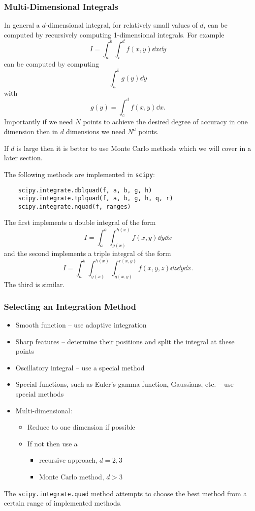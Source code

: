 \documentclass[a4paper]{article}
\begin{document}
    \subsubsection{Multi-Dimensional Integrals}
    In general a \(d\)-dimensional integral, for relatively small values of \(d\), can be computed by recursively computing 1-dimensional integrals.
    For example
    \[I = \int_a^b \int_c^d f(x, y)\dd{x}\dd{y}\]
    can be computed by computing
    \[\int_a^b g(y)\dd{y}\]
    with
    \[g(y) = \int_c^d f(x, y)\dd{x}.\]
    Importantly if we need \(N\) points to achieve the desired degree of accuracy in one dimension then in \(d\) dimensions we need \(N^d\) points.
    
    If \(d\) is large then it is better to use Monte Carlo methods which we will cover in a later section.
    
    The following methods are implemented in \lstinline|scipy|:
    \begin{lstlisting}
    scipy.integrate.dblquad(f, a, b, g, h)
    scipy.integrate.tplquad(f, a, b, g, h, q, r)
    scipy.integrate.nquad(f, ranges)
    \end{lstlisting}
    The first implements a double integral of the form
    \[I = \int_a^b \int_{g(x)}^{h(x)}f(x, y)\dd{y}\dd{x}\]
    and the second implements a triple integral of the form
    \[I = \int_a^b \int_{g(x)}^{h(x)}\int_{q(x, y)}^{r(x, y)} f(x, y, z) \dd{z}\dd{y}\dd{x}.\]
    The third is similar.
    
    \subsubsection{Selecting an Integration Method}
    \begin{itemize}
        \item Smooth function -- use adaptive integration
        \item Sharp features -- determine their positions and split the integral at these points
        \item Oscillatory integral -- use a special method
        \item Special functions, such as Euler's gamma function, Gaussians, etc. -- use special methods
        \item Multi-dimensional:
        \begin{itemize}
            \item Reduce to one dimension if possible
            \item If not then use a
            \begin{itemize}
                \item recursive approach, \(d = 2, 3\)
                \item Monte Carlo method, \(d > 3\)
            \end{itemize}
        \end{itemize}
    \end{itemize}
    The \lstinline|scipy.integrate.quad| method attempts to choose the best method from a certain range of implemented methods.
    
\end{document}

